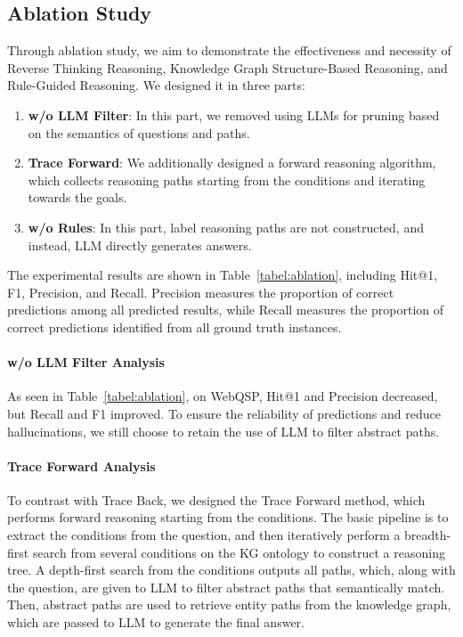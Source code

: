 \subsection{Ablation Study}

Through ablation study, we aim to demonstrate the effectiveness and necessity of Reverse Thinking Reasoning, Knowledge Graph Structure-Based Reasoning, and Rule-Guided Reasoning. We designed it in three parts:
\begin{enumerate}
    \item \textbf{w/o LLM Filter}: In this part, we removed using LLMs for pruning based on the semantics of questions and paths.
    \item \textbf{Trace Forward}: We additionally designed a forward reasoning algorithm, which collects reasoning paths starting from the conditions and iterating towards the goals.
    \item \textbf{w/o Rules}: In this part, label reasoning paths are not constructed, and instead, LLM directly generates answers.
\end{enumerate}

The experimental results are shown in Table~\ref{tabel:ablation}, including Hit@1, F1, Precision, and Recall. Precision measures the proportion of correct predictions among all predicted results, while Recall measures the proportion of correct predictions identified from all ground truth instances.

\paragraph{w/o LLM Filter Analysis}As seen in Table~\ref{tabel:ablation}, on WebQSP, Hit@1 and Precision decreased, but Recall and F1 improved. To ensure the reliability of predictions and reduce hallucinations, we still choose to retain the use of LLM to filter abstract paths.

\paragraph{Trace Forward Analysis}To contrast with Trace Back, we designed the Trace Forward method, which performs forward reasoning starting from the conditions. The basic pipeline is to extract the conditions from the question, and then iteratively perform a breadth-first search from several conditions on the KG ontology to construct a reasoning tree. A depth-first search from the conditions outputs all paths, which, along with the question, are given to LLM to filter abstract paths that semantically match. Then, abstract paths are used to retrieve entity paths from the knowledge graph, which are passed to LLM to generate the final answer. 

